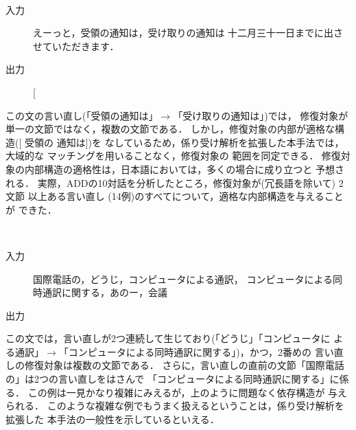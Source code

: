 \begin{Ex}\label{Ex:Example3}
\rm\
\begin{description}
  \item[入力] えーっと，受領の通知は，受け取りの通知は
十二月三十一日までに出させていただきます．
  \item[出力]
[ \SS{
 [\DP{rept} \SS{
  [\DP{of\&gen}
   [\DP{hest}
    えーっと\Q
    受領の]\Q
   通知は]\\\relax
  [\DP{of\&gen}
   受け取りの\Q
   通知は]]}\\\relax
 [\DP{tlim\&madeni}
  十二月三十一日までに\Q
  出させていただきます]]}
\end{description}
\end{Ex}

この文の言い直し(「受領の通知は」$\to$「受け取りの通知は」)では，
修復対象が単一の文節ではなく，複数の文節である．
しかし，修復対象の内部が適格な構造([ 受領の 通知は])を
なしているため，係り受け解析を拡張した本手法では，大域的な
マッチング\cite{Kikui:ICSLP94-915}を用いることなく，修復対象の
範囲を同定できる．
修復対象の内部構造の適格性は，日本語においては，多くの場合に成り立つと
予想される．
実際，ADDの10対話を分析したところ，修復対象が(冗長語を除いて) 2文節
以上ある言い直し (14例)のすべてについて，適格な内部構造を与えることが
できた．

\begin{Ex}\label{Eq:Example4}
\rm\
\begin{description}
  \item[入力] 国際電話の，どうじ，コンピュータによる通訳，
コンピュータによる同時通訳に関する，あのー，会議
  \item[出力] 
\end{description}
\end{Ex}

この文では，言い直しが2つ連続して生じており(「どうじ」「コンピュータに
よる通訳」$\to$「コンピュータによる同時通訳に関する」)，かつ，2番めの
言い直しの修復対象は複数の文節である．
さらに，言い直しの直前の文節「国際電話の」は2つの言い直しをはさんで
「コンピュータによる同時通訳に関する」に係る．
この例は一見かなり複雑にみえるが，上のように問題なく依存構造が
与えられる．
このような複雑な例でもうまく扱えるということは，係り受け解析を拡張した
本手法の一般性を示しているといえる．

